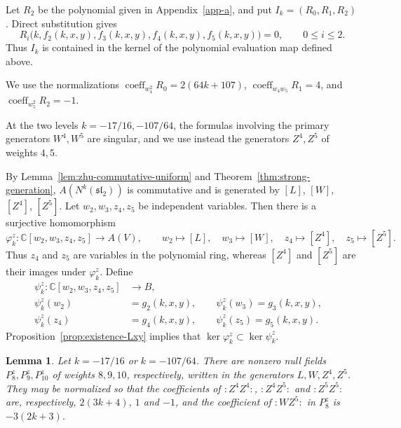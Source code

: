 \documentclass[11 pt]{amsart}
\newtheorem{lemma}{Lemma}
\theoremstyle{definition}
\theoremstyle{plain}
\begin{document}
Let $R_2$ be the polynomial given in Appendix~\ref{app-a}, and put
$I_k=(R_0,R_1,R_2)$.
Direct substitution gives
\[
R_i\bigl(k,f_2(k,x,y),f_3(k,x,y),
f_4(k,x,y),f_5(k,x,y)\bigr)=0,
\qquad 0\leq i\leq2.
\]
Thus $I_k$ is contained in the kernel of the polynomial evaluation map
defined above.

We use the normalizations
$\operatorname{coeff}_{w_4^2}R_0=2(64k+107)$,
$\operatorname{coeff}_{w_4w_5}R_1=4$, and
$\operatorname{coeff}_{w_5^2}R_2=-1$.

At the two levels $k=-17/16,-107/64$,
the formulas involving the primary generators $W^4,W^5$ are singular, and
we use instead the generators $Z^4,Z^5$ of weights $4,5$.

By Lemma~\ref{lem:zhu-commutative-uniform} and
Theorem~\ref{thm:strong-generation}, $A(N^k(\mathfrak{sl}_2))$ is
commutative and is generated by
$[L]$, $[W]$, $[Z^4]$, $[Z^5]$.
Let $w_2,w_3,z_4,z_5$ be independent variables.  Then there is a
surjective homomorphism
\[
\varphi_k^z:\mathbb C[w_2,w_3,z_4,z_5]\longrightarrow A(V),
\qquad
w_2\mapsto [L],\quad w_3\mapsto [W],\quad
z_4\mapsto [Z^4],\quad z_5\mapsto [Z^5].
\]
Thus $z_4$ and $z_5$ are variables in the polynomial ring, whereas
$[Z^4]$ and $[Z^5]$ are their images under $\varphi_k^z$.
Define
\[
\begin{aligned}
\psi_k^z:\mathbb C[w_2,w_3,z_4,z_5]&\longrightarrow B,\\
\psi_k^z(w_2)&=g_2(k,x,y),\qquad
\psi_k^z(w_3)=g_3(k,x,y),\\
\psi_k^z(z_4)&=g_4(k,x,y),\qquad
\psi_k^z(z_5)=g_5(k,x,y). &
\end{aligned}
\]
Proposition~\ref{prop:existence-Lxy} implies that
$
  \ker\varphi_k^z\subset\ker\psi_k^z
$.

\begin{lemma}\label{lem:exceptional-null-fields}
Let $k=-17/16$ or $k=-107/64$.  There are nonzero null fields
$P_8^z,P_9^z,P_{10}^z$ of weights $8,9,10$, respectively, written in the
generators $L,W,Z^4,Z^5$.  They may be normalized so that the coefficients of
$:Z^4Z^4:$, $:Z^4Z^5:$ and $:Z^5Z^5:$ are, respectively,
$2(3k+4)$, $1$ and $-1$,
and the coefficient of $:WZ^5:$ in $P_8^z$ is $-3(2k+3)$.
\end{lemma}
\end{document}
